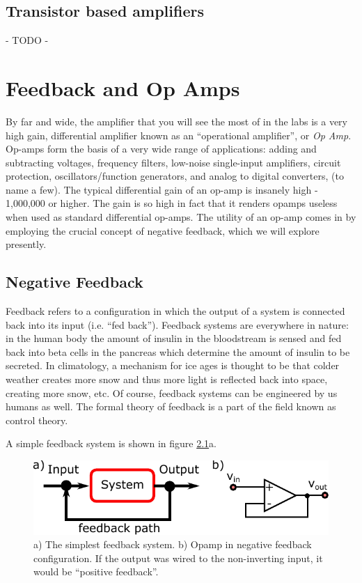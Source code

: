 \documentclass{tufte-book}
\begin{document}
\section{Transistor based amplifiers}
- TODO -


\chapter{Feedback and Op Amps}
By far and wide, the amplifier that you will see the most of in the labs is a very high gain, differential amplifier known as an ``operational amplifier'', or \textit{Op Amp}. Op-amps form the basis of a very wide range of applications: adding and subtracting voltages, frequency filters, low-noise single-input amplifiers, circuit protection, oscillators/function generators, and analog to digital converters, (to name a few). The typical differential gain of an op-amp is insanely high - 1,000,000 or higher. The gain is so high in fact that it renders opamps useless when used as standard differential op-amps. The utility of an op-amp comes in by employing the crucial concept of negative feedback, which we will explore presently.

\section{Negative Feedback}
Feedback refers to a configuration in which the output of a system is connected back into its input (i.e. ``fed back''). Feedback systems are everywhere in nature: in the human body the amount of insulin in the bloodstream is sensed and fed back into beta cells in the pancreas which determine the amount of insulin to be secreted. In climatology, a mechanism for ice ages is thought to be that colder weather creates more snow and thus more light is reflected back into space, creating more snow, etc. Of course, feedback systems can be engineered by us humans as well. The formal theory of feedback is a part of the field known as control theory.

A simple feedback system is shown in figure \ref{fig:simple_feedback}a.

\begin{figure}[ht]
\caption{a) The simplest feedback system. b) Opamp in negative feedback configuration. If the output was wired to the non-inverting input, it would be ``positive feedback''.}
\label{fig:simple_feedback}
\begin{center}
\includegraphics[]{Images/simple_feedback.pdf}
\end{center}
\end{figure}
\end{document}
